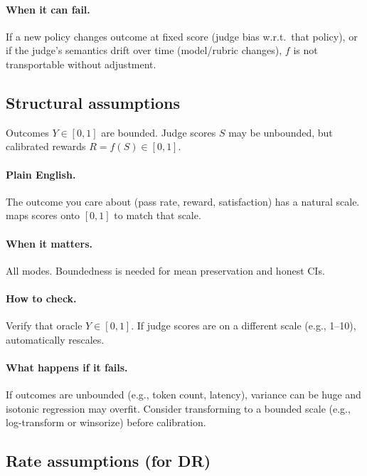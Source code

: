 \paragraph{When it can fail.} If a new policy changes outcome at fixed score (judge bias w.r.t.\ that policy), or if the judge's semantics drift over time (model/rubric changes), $f$ is not transportable without adjustment.

\subsection{Structural assumptions}

\begin{assumption}
\label{assum:bounded}
Outcomes $Y \in [0, 1]$ are bounded. Judge scores $S$ may be unbounded, but calibrated rewards $R = f(S) \in [0, 1]$.
\end{assumption}

\paragraph{Plain English.} The outcome you care about (pass rate, reward, satisfaction) has a natural scale. \autocal{} maps scores onto $[0, 1]$ to match that scale.

\paragraph{When it matters.} All modes. Boundedness is needed for mean preservation and honest CIs.

\paragraph{How to check.} Verify that oracle $Y \in [0, 1]$. If judge scores are on a different scale (e.g., 1--10), \autocal{} automatically rescales.

\paragraph{What happens if it fails.} If outcomes are unbounded (e.g., token count, latency), variance can be huge and isotonic regression may overfit. Consider transforming to a bounded scale (e.g., log-transform or winsorize) before calibration.

\subsection{Rate assumptions (for DR)}

